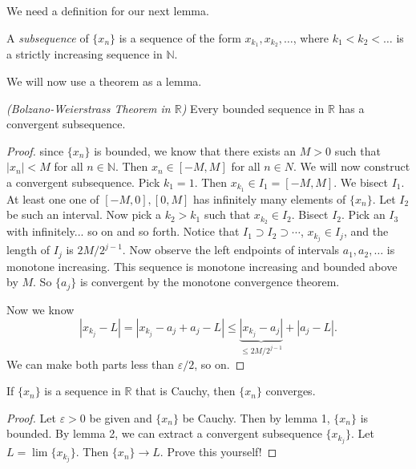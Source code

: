 \documentclass[11pt]{article}
\theoremstyle{definition}
\newcommand{\R}{\mathbb{R}}                      %
\newcommand{\N}{\mathbb{N}}
\begin{document}
We need a definition for our next lemma.

 A \textit{subsequence} of $\{x_n\}$ is a sequence of the form $x_{k_1},x_{k_2},\dots$, where $k_1<k_2<\dots$ is a strictly increasing sequence in $\N$.

We will now use a theorem as a lemma.

\lem \textit{(Bolzano-Weierstrass Theorem in $\R$)} Every bounded sequence in $\R$ has a convergent subsequence.

\begin{proof}
    since $\{x_n\}$ is bounded, we know that there exists an $M>0$ such that $|x_n|<M$ for all $n\in\N$. Then $x_n\in[-M,M]$ for all $n\in N$. We will now construct a convergent subsequence. Pick $k_1=1$. Then $x_{k_1}\in I_1=[-M,M]$. We bisect $I_1$. At least one one of $[-M,0],[0,M]$ has infinitely many elements of $\{x_n\}$. Let $I_2$ be such an interval. Now pick a $k_2>k_1$ such that $x_{k_2}\in I_2$. Bisect $I_2$. Pick an $I_3$ with infinitely... so on and so forth. Notice that $I_1\supset I_2\supset\cdots$, $x_{k_j}\in I_j$, and the length of $I_j$ is $2M/2^{j-1}$. Now observe the left endpoints of intervals $a_1,a_2,\dots$ is monotone increasing. This sequence is monotone increasing and bounded above by $M$. So $\{a_j\}$ is convergent by the monotone convergence theorem.

    Now we know
    $$
    |x_{k_j}-L|=|x_{k_j}-a_j+a_j-L|\leq \underbrace{|x_{k_j}-a_j|}_{\leq 2M/2^{j-1}}+|a_j-L|.
    $$
    We can make both parts less than $\varepsilon/2$, so on.
\end{proof}

\begin{shaded}
\theorem If $\{x_n\}$ is a sequence in $\R$ that is Cauchy, then $\{x_n\}$ converges.

\begin{proof}
    Let $\varepsilon>0$ be given and $\{x_n\}$ be Cauchy. Then by lemma 1, $\{x_n\}$ is bounded. By lemma 2, we can extract a convergent subsequence $\{x_{k_j}\}$. Let $L=\lim\{x_{k_j}\}$. Then $\{x_n\}\to L$. Prove this yourself!
\end{proof}
\end{shaded}
\end{document}
